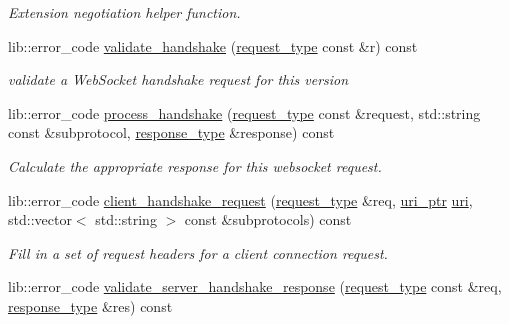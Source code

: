 \begin{DoxyCompactItemize}
\begin{DoxyCompactList}\small\item\em Extension negotiation helper function. \end{DoxyCompactList}\item 
lib\+::error\+\_\+code \hyperlink{classwebsocketpp_1_1processor_1_1hybi13_a5d85b6f0af1c787b3c9e9e13584c0aab}{validate\+\_\+handshake} (\hyperlink{classwebsocketpp_1_1processor_1_1hybi13_aaf7438e06dfb60da29ef201f8c8cf2dd}{request\+\_\+type} const \&r) const 
\begin{DoxyCompactList}\small\item\em validate a Web\+Socket handshake request for this version \end{DoxyCompactList}\item 
lib\+::error\+\_\+code \hyperlink{classwebsocketpp_1_1processor_1_1hybi13_ab288f10fdc15f79223cf7b870d2e39b4}{process\+\_\+handshake} (\hyperlink{classwebsocketpp_1_1processor_1_1hybi13_aaf7438e06dfb60da29ef201f8c8cf2dd}{request\+\_\+type} const \&request, std\+::string const \&subprotocol, \hyperlink{classwebsocketpp_1_1processor_1_1hybi13_a5d918ca9c9aa6c38a145f2ef1d2aa38a}{response\+\_\+type} \&response) const 
\begin{DoxyCompactList}\small\item\em Calculate the appropriate response for this websocket request. \end{DoxyCompactList}\item 
lib\+::error\+\_\+code \hyperlink{classwebsocketpp_1_1processor_1_1hybi13_a1b43f134c5cb79d6a3f75c8f6e94069b}{client\+\_\+handshake\+\_\+request} (\hyperlink{classwebsocketpp_1_1processor_1_1hybi13_aaf7438e06dfb60da29ef201f8c8cf2dd}{request\+\_\+type} \&req, \hyperlink{namespacewebsocketpp_aae370ea5ac83a8ece7712cb39fc23f5b}{uri\+\_\+ptr} \hyperlink{classwebsocketpp_1_1uri}{uri}, std\+::vector$<$ std\+::string $>$ const \&subprotocols) const 
\begin{DoxyCompactList}\small\item\em Fill in a set of request headers for a client connection request. \end{DoxyCompactList}\item 
lib\+::error\+\_\+code \hyperlink{classwebsocketpp_1_1processor_1_1hybi13_af818948793f43329c2b3b2845394be5c}{validate\+\_\+server\+\_\+handshake\+\_\+response} (\hyperlink{classwebsocketpp_1_1processor_1_1hybi13_aaf7438e06dfb60da29ef201f8c8cf2dd}{request\+\_\+type} const \&req, \hyperlink{classwebsocketpp_1_1processor_1_1hybi13_a5d918ca9c9aa6c38a145f2ef1d2aa38a}{response\+\_\+type} \&res) const 

\end{DoxyCompactItemize}
